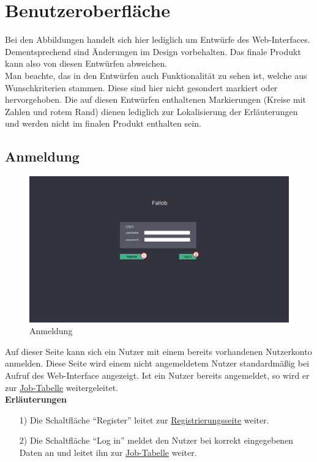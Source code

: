 \section{Benutzeroberfläche}

Bei den Abbildungen handelt sich hier lediglich um Entwürfe des Web-Interfaces. Dementsprechend sind Änderungen im Design vorbehalten. Das finale Produkt kann also von diesen Entwürfen abweichen.\\
Man beachte, das in den Entwürfen auch Funktionalität zu sehen ist, welche aus Wunschkriterien stammen. Diese sind hier nicht gesondert markiert oder hervorgehoben. Die auf diesen Entwürfen enthaltenen Markierungen (Kreise mit Zahlen und rotem Rand) dienen lediglich zur Lokalisierung der Erläuterungen und werden nicht im finalen Produkt enthalten sein.
\subsection{Anmeldung}
\label{pages:login}
\begin{figure}[H]
    \centering
    \includegraphics[width=\textwidth]{images-interface/v4_interface/login_page_4.pdf}
    \caption{Anmeldung}
    \label{fig:login}
\end{figure}
Auf dieser Seite kann sich ein \gls{Nutzer} mit einem bereits vorhandenen \gls{Nutzerkonto} anmelden. Diese Seite wird einem nicht angemeldetem \gls{Nutzer} standardmäßig bei Aufruf des \gls{Web-Interface} angezeigt. Ist ein \gls{Nutzer} bereits angemeldet, so wird er zur \hyperref[pages:job-table]{Job-Tabelle} weitergeleitet.\\
\newpage
\textbf{Erläuterungen}
\begin{itemize}
    \item[1)] Die Schaltfläche \enquote{Register} leitet zur \hyperref[pages:register]{Registrierungsseite} weiter.
    \item[2)] Die Schaltfläche \enquote{Log in} meldet den \gls{Nutzer} bei korrekt eingegebenen Daten an und leitet ihn zur \hyperref[pages:job-table]{Job-Tabelle} weiter.
\end{itemize}

